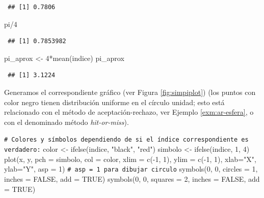 \documentclass[
]{book}
\newenvironment{Shaded}{\begin{snugshade}}{\end{snugshade}}
\newcommand{\AttributeTok}[1]{\textcolor[rgb]{0.77,0.63,0.00}{#1}}
\newcommand{\CommentTok}[1]{\textcolor[rgb]{0.56,0.35,0.01}{\textit{#1}}}
\newcommand{\ConstantTok}[1]{\textcolor[rgb]{0.00,0.00,0.00}{#1}}
\newcommand{\DecValTok}[1]{\textcolor[rgb]{0.00,0.00,0.81}{#1}}
\newcommand{\FunctionTok}[1]{\textcolor[rgb]{0.00,0.00,0.00}{#1}}
\newcommand{\NormalTok}[1]{#1}
\newcommand{\OtherTok}[1]{\textcolor[rgb]{0.56,0.35,0.01}{#1}}
\newcommand{\SpecialCharTok}[1]{\textcolor[rgb]{0.00,0.00,0.00}{#1}}
\newcommand{\StringTok}[1]{\textcolor[rgb]{0.31,0.60,0.02}{#1}}
\theoremstyle{break}
\theoremstyle{nonumberplain}
\renewcommand{\CommentTok}[1]{\textcolor[rgb]{0.41,0.41,0.41}{\texttt{#1}}}
\begin{document}
\begin{verbatim}
 ## [1] 0.7806
\end{verbatim}

\begin{Shaded}
\begin{Highlighting}[]
\NormalTok{pi}\SpecialCharTok{/}\DecValTok{4}
\end{Highlighting}
\end{Shaded}

\begin{verbatim}
 ## [1] 0.7853982
\end{verbatim}

\begin{Shaded}
\begin{Highlighting}[]
\NormalTok{pi\_aprox }\OtherTok{\textless{}{-}} \DecValTok{4}\SpecialCharTok{*}\FunctionTok{mean}\NormalTok{(indice)}
\NormalTok{pi\_aprox}
\end{Highlighting}
\end{Shaded}

\begin{verbatim}
 ## [1] 3.1224
\end{verbatim}

Generamos el correspondiente gráfico (ver Figura \ref{fig:simpiplot}) (los puntos con color negro tienen distribución uniforme en el círculo unidad; esto está relacionado con el método de aceptación-rechazo, ver Ejemplo \ref{exm:ar-esfera}, o con el denominado método \emph{hit-or-miss}).

\begin{Shaded}
\begin{Highlighting}[]
\CommentTok{\# Colores y símbolos dependiendo de si el índice correspondiente es verdadero:}
\NormalTok{color }\OtherTok{\textless{}{-}} \FunctionTok{ifelse}\NormalTok{(indice, }\StringTok{"black"}\NormalTok{, }\StringTok{"red"}\NormalTok{) }
\NormalTok{simbolo }\OtherTok{\textless{}{-}} \FunctionTok{ifelse}\NormalTok{(indice, }\DecValTok{1}\NormalTok{, }\DecValTok{4}\NormalTok{)}
\FunctionTok{plot}\NormalTok{(x, y, }\AttributeTok{pch =}\NormalTok{ simbolo, }\AttributeTok{col =}\NormalTok{ color, }
     \AttributeTok{xlim =} \FunctionTok{c}\NormalTok{(}\SpecialCharTok{{-}}\DecValTok{1}\NormalTok{, }\DecValTok{1}\NormalTok{), }\AttributeTok{ylim =} \FunctionTok{c}\NormalTok{(}\SpecialCharTok{{-}}\DecValTok{1}\NormalTok{, }\DecValTok{1}\NormalTok{), }\AttributeTok{xlab=}\StringTok{"X"}\NormalTok{, }\AttributeTok{ylab=}\StringTok{"Y"}\NormalTok{, }\AttributeTok{asp =} \DecValTok{1}\NormalTok{) }
     \CommentTok{\# asp = 1 para dibujar circulo}
\FunctionTok{symbols}\NormalTok{(}\DecValTok{0}\NormalTok{, }\DecValTok{0}\NormalTok{, }\AttributeTok{circles =} \DecValTok{1}\NormalTok{, }\AttributeTok{inches =} \ConstantTok{FALSE}\NormalTok{, }\AttributeTok{add =} \ConstantTok{TRUE}\NormalTok{)}
\FunctionTok{symbols}\NormalTok{(}\DecValTok{0}\NormalTok{, }\DecValTok{0}\NormalTok{, }\AttributeTok{squares =} \DecValTok{2}\NormalTok{, }\AttributeTok{inches =} \ConstantTok{FALSE}\NormalTok{, }\AttributeTok{add =} \ConstantTok{TRUE}\NormalTok{)}
\end{Highlighting}
\end{Shaded}
\end{document}
